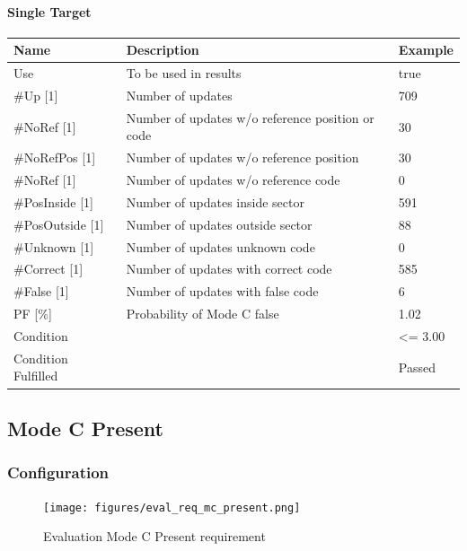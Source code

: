 \paragraph{Single Target}

\begin{center}
 \begin{table}[H]
  \begin{tabularx}{\textwidth}{ | l | X |  l | }
    \hline
    \textbf{Name} & \textbf{Description} & \textbf{Example} \\ \hline
    Use & To be used in results & true \\ \hline
    \#Up [1] & Number of updates & 709 \\ \hline
    \#NoRef [1] & Number of updates w/o reference position or code & 30 \\ \hline
    \#NoRefPos [1] & Number of updates w/o reference position  & 30 \\ \hline
    \#NoRef [1] & Number of updates w/o reference code & 0 \\ \hline
    \#PosInside [1] & Number of updates inside sector & 591 \\ \hline
    \#PosOutside [1] & Number of updates outside sector & 88 \\ \hline
    \#Unknown [1] & Number of updates unknown code & 0 \\ \hline
    \#Correct [1] & Number of updates with correct code & 585 \\ \hline
    \#False [1] & Number of updates with false code & 6 \\ \hline
    PF [\%] & Probability of Mode C false & 1.02 \\ \hline
    Condition &  & <= 3.00 \\ \hline
    Condition Fulfilled &  & Passed \\ \hline
\end{tabularx}
\end{table}
\end{center}

\subsection{Mode C Present}
\label{sec:eval_req_mc_present} 

\subsubsection{Configuration}

\begin{figure}[H]
    \texttt{[image: figures/eval\_req\_mc\_present.png]}
  \caption{Evaluation Mode C Present requirement}
\end{figure}

